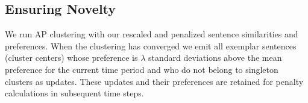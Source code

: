 \subsection{Ensuring Novelty}
We run AP clustering with our rescaled and penalized sentence similarities
and preferences. When the clustering has converged we emit all exemplar
sentences (cluster centers) whose preference is $\lambda$ standard deviations
above the mean preference for the current time period and who do not belong
to singleton clusters as updates. These updates and their preferences are 
retained for penalty calculations in subsequent time steps.


